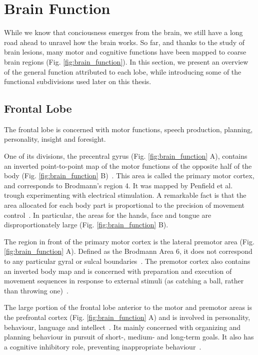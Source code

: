 \section{Brain Function}

While we know that conciousness emerges from the brain, we still have a long road
ahead to unravel how the brain works. So far, and thanks to the study of
brain lesions, many motor and cognitive functions have been mapped to coarse
brain regions (Fig. \ref{fig:brain_function}). In this section, we present an
overview of the general function attributed to each lobe, while introducing 
some of the functional subdivisions used later on this thesis.

\subsection{Frontal Lobe}
The frontal lobe is concerned with motor functions, speech production, 
planning, personality, insight and foresight.

One of its divisions, the precentral gyrus (Fig. \ref{fig:brain_function} A),
contains an inverted point-to-point map of the motor functions of the opposite
half of the body (Fig. \ref{fig:brain_function} B)~\cite{Johns, Purves2004,
Catani2012}. This area is called the primary motor cortex, and corresponds to
Brodmann's region 4. It was mapped by Penfield et al.~\cite{Penfield1954} trough
experimenting with electrical stimulation. A remarkable fact is that the area
allocated for each body part is proportional to the precision of movement
control~\cite{Johns}. In particular, the areas for the hands, face and tongue
are disproportionately large (Fig. \ref{fig:brain_function} B).

The region in front of the primary motor cortex is the lateral premotor area (Fig. \ref{fig:brain_function} A).
Defined as the Brodmann Area 6, it does not correspond to any particular gyral
or sulcal boundaries~\cite{Johns, Purves2004}. The premotor cortex also contains
an inverted body map and is concerned with preparation and execution of movement
sequences in response to external stimuli (as catching a ball, rather than throwing one)~\cite{Johns}.

The large portion of the frontal lobe anterior to the motor
and premotor areas is the prefrontal cortex (Fig. \ref{fig:brain_function} A) and is involved in personality, 
behaviour, language and intellect~\cite{Johns}. Its mainly concerned with
organizing and planning behaviour in pursuit of short-, medium- and long-term goals.
It also has a cognitive inhibitory role, preventing inappropriate behaviour~\cite{Sigman2017}.

